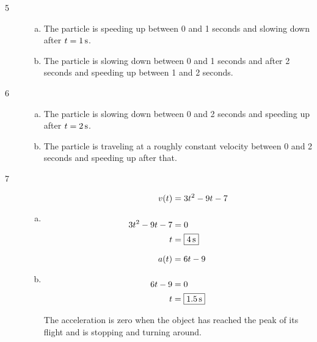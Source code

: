 \documentclass[letterpaper, landscape]{exam}
\begin{document}
  \begin{description}

    \item[5] 
      \begin{enumerate}[(a)]
        \item The particle is speeding up between 0 and 1 seconds and slowing down after 
          $t = \unit[1]{s}$.

        \item The particle is slowing down between 0 and 1 seconds and after 2 seconds and speeding
          up between 1 and 2 seconds.

      \end{enumerate}

    \item[6] 
      \begin{enumerate}[(a)]
        \item The particle is slowing down between 0 and 2 seconds and speeding up after 
          $t = \unit[2]{s}$.

        \item The particle is traveling at a roughly constant velocity between 0 and 2 seconds and
          speeding up after that.

      \end{enumerate}

    \item[7]
      \begin{enumerate}[(a)]
        \item 
          \begin{align*}
            v(t)          & = 3t^2 - 9t - 7 \\
            \\
            3t^2 - 9t - 7 & = 0 \\
            t             & = \boxed{ \unit[4]{s} } \\
          \end{align*}

        \item
          \begin{align*}
            a(t)   & = 6t - 9 \\
            \\
            6t - 9 & = 0 \\
            t      & = \boxed{ \unit[1.5]{s} } \\
          \end{align*}

          The acceleration is zero when the object has reached the peak of its flight and is
          stopping and turning around.


\end{enumerate}
\end{description}
\end{document}
